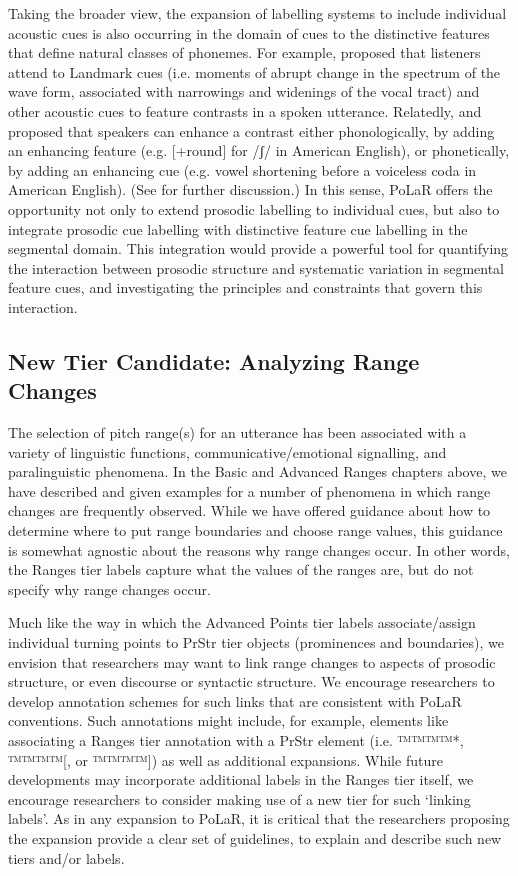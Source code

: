 \documentclass[11pt, twoside]{memoir}
\begin{document}
Taking the broader view,  the expansion of labelling systems to include individual acoustic cues is also occurring in the domain of cues to the distinctive features that define natural classes of phonemes.  For example, \citet{stevens02} proposed that listeners attend to Landmark cues (i.e. moments of abrupt change in the spectrum of the wave form, associated with narrowings and widenings of the vocal tract) and other acoustic cues to feature contrasts in a spoken utterance.  Relatedly, \citet{stevenskeyser89} and \citet{keyserstevens01} proposed that speakers can enhance a contrast either phonologically, by adding an enhancing feature (e.g. [+round] for /ʃ/ in American English), or phonetically, by adding an enhancing cue (e.g. vowel shortening before a voiceless coda in American English).  (See \citealt{clements09} for further discussion.)   In this sense, PoLaR offers the opportunity not only to extend prosodic labelling to individual cues, but also to integrate prosodic cue labelling with distinctive feature cue labelling in the segmental domain.  This integration would provide a powerful tool for quantifying the interaction between prosodic structure and systematic variation in segmental feature cues, and investigating the principles and constraints that govern this interaction.  

\subsection{New Tier Candidate: Analyzing Range Changes}\label{sec:new-tier-range-changes}
The selection of pitch range(s) for an utterance has been associated with a variety of linguistic functions, communicative\slash emotional signalling, and paralinguistic phenomena. In the Basic and Advanced Ranges chapters above, we have described and given examples for a number of phenomena in which range changes are frequently observed.  While we have offered guidance about how to determine where to put range boundaries and choose range values, this guidance is somewhat agnostic about the reasons why range changes occur. In other words, the Ranges tier labels capture what the values of the ranges are, but do not specify why range changes occur. 

Much like the way in which the Advanced Points tier labels associate\slash assign individual turning points to PrStr tier objects (prominences and boundaries), we envision that researchers may want to link range changes to aspects of prosodic structure, or even discourse or syntactic structure. We encourage researchers to develop annotation schemes for such links that are consistent with PoLaR conventions. Such annotations might include, for example, elements like associating a Ranges tier annotation with a PrStr element (i.e. ™™™™{*}, ™™™™{[}, or ™™™™{]}) as well as additional expansions. While future developments may incorporate additional labels in the Ranges tier itself, we encourage researchers to consider making use of a new tier for such ‘linking labels’. As in any expansion to PoLaR, it is critical that the researchers proposing the expansion provide a clear set of guidelines, to explain and describe such new tiers and/or labels.
\end{document}

